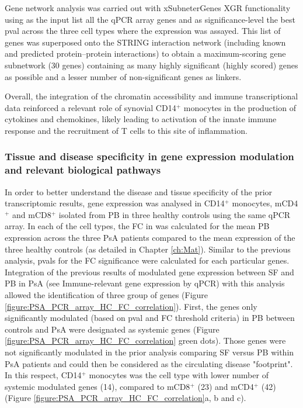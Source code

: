 Gene network analysis was carried out with xSubneterGenes XGR functionality using as the input list all the qPCR array genes and as significance-level the best pval across the three cell types where the expression was assayed. This list of genes was superposed onto the STRING interaction network (including known and predicted protein–protein interactions) to obtain a maximum-scoring gene subnetwork (30 genes) containing as many highly significant (highly scored) genes as possible and a lesser number of non-significant genes as linkers.


Overall, the integration of the chromatin accessibility and immune transcriptional data reinforced a relevant role of synovial CD14$^+$ monocytes in the production of cytokines and chemokines, likely leading to activation of the innate immune response and the recruitment of T cells to this site of inflammation. 



\subsubsection{Tissue and disease specificity in gene expression modulation and relevant biological pathways}

In order to better understand the disease and tissue specificity of the prior transcriptomic results, gene expression was analysed in CD14$^+$ monocytes, mCD4$^+$ and mCD8$^+$ isolated from PB in three healthy controls using the same qPCR array. In each of the cell types, the FC in was calculated for the mean PB expression across the three PsA patients compared to the mean expression of the three healthy controls (as detailed in Chapter \ref{ch:Mat}). Similar to the previous analysis, pvals for the FC significance were calculated for each particular genes. Integration of the previous results of modulated gene expression between SF and PB in PsA (see Immune-relevant gene expression by qPCR) with this analysis allowed the identification of three group of genes (Figure \ref{figure:PSA_PCR_array_HC_FC_correlation}). First, the genes only significantly modulated (based on pval and FC threshold criteria) in PB between controls and PsA were designated as systemic genes (Figure \ref{figure:PSA_PCR_array_HC_FC_correlation} green dots). Those genes were not significantly modulated in the prior analysis comparing SF versus PB within PsA patients and could then be considered as the circulating disease "footprint". In this respect, CD14$^+$ monocytes was the cell type with lower number of systemic modulated genes (14), compared to mCD8$^+$ (23) and mCD4$^+$ (42) (Figure \ref{figure:PSA_PCR_array_HC_FC_correlation}a, b and c). 


